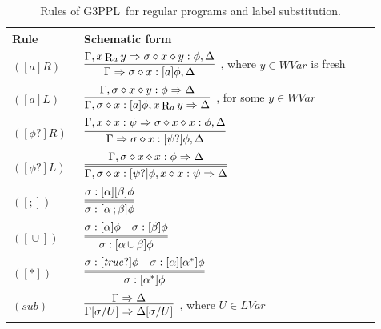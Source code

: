 \documentclass[manuscript,screen]{acmart}
\newcommand{\true}[0]{\mathit{true}}
\DeclareMathOperator{\seq}{;}
\DeclareMathOperator{\cho}{\cup}
\newcommand{\Sub}[0]{{\textit{sub}}}
\newcommand{\lup}[0]{*}
\newcommand{\cat}[0]{\diamond}
\newcommand{\LVar}[0]{\mathit{LVar}}
\newcommand{\GiiiPPL}[0]{\mbox{G3PPL}}
\newcommand{\WVar}[0]{\textit{WVar}}
\DeclareMathOperator{\R}{R}
\begin{document}
\begin{table}[t]
\centering
\small
\begin{tabular}{p{0.18\linewidth}p{0.74\linewidth}}
\toprule
Rule & Schematic form \\
\midrule
$([a]R)$ & $\begin{aligned}\infer[]{\Gamma\Rightarrow \sigma\cat x:[a]\phi,\Delta}{\Gamma,x\R_a y\Rightarrow \sigma\cat x\cat y:\phi,\Delta}\end{aligned}$, where $y\in\WVar$ is fresh\\[1.2em]
$([a]L)$ & $\begin{aligned}\infer[]{\Gamma,\sigma\cat x:[a]\phi,x\R_a y\Rightarrow\Delta}{\Gamma,\sigma\cat x\cat y:\phi\Rightarrow\Delta}\end{aligned}$, for some $y\in\WVar$\\[1.2em]
$([\phi?]R)$ & $\begin{aligned}\infer=[]{\Gamma\Rightarrow\sigma\cat x:[\psi?]\phi,\Delta}{\Gamma,x\cat x:\psi\Rightarrow\sigma\cat x\cat x:\phi,\Delta}\end{aligned}$\\[1.2em]
$([\phi?]L)$ & $\begin{aligned}\infer=[]{\Gamma,\sigma\cat x:[\psi?]\phi,x\cat x:\psi\Rightarrow\Delta}{\Gamma,\sigma\cat x\cat x:\phi\Rightarrow\Delta}\end{aligned}$\\[1.2em]
$([\seq])$ & $\begin{aligned}\infer=[]{\sigma:[\alpha\seq\beta]\phi}{\sigma:[\alpha][\beta]\phi}\end{aligned}$\\[1.2em]
$([\cho])$ & $\begin{aligned}\infer=[]{\sigma:[\alpha\cho\beta]\phi}{\sigma:[\alpha]\phi & \sigma:[\beta]\phi}\end{aligned}$\\[1.2em]
$([\lup])$ & $\begin{aligned}\infer=[]{\sigma:[\alpha^\lup]\phi}{\sigma:[\true?]\phi & \sigma:[\alpha][\alpha^\lup]\phi}\end{aligned}$\\[1.2em]
$(\Sub)$ & $\begin{aligned}\infer[]{\Gamma[\sigma/U]\Rightarrow\Delta[\sigma/U]}{\Gamma\Rightarrow\Delta}\end{aligned}$, where $U\in\LVar$\\
\bottomrule
\end{tabular}
\caption{Rules of \GiiiPPL\ for regular programs and label substitution.}
\label{table:giiippl-regular-rules}
\end{table}
\end{document}
